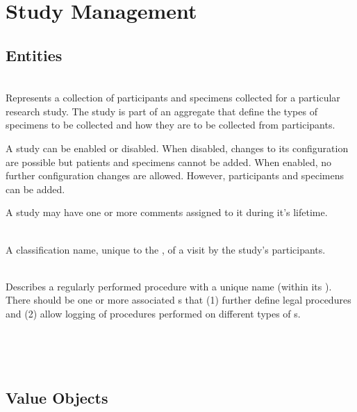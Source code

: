 \chapter{Study Management}

\section{Entities}

\begin{description}[listparindent=\parindent]

  \item[\entitytarget{Study}] \hfill \\ Represents a collection of participants and
    specimens collected for a particular research study. The study is part of
    an aggregate that define the types of specimens to be collected and how
    they are to be collected from participants.

    A study can be enabled or disabled. When disabled, changes to its
    configuration are possible but patients and specimens cannot be added. When
    enabled, no further configuration changes are allowed. However,
    participants and specimens can be added.

    A study may have one or more comments assigned to it during it's lifetime.

  \item[\entitytarget{CollectionEventType}] \hfill \\ A classification name,
    unique to the , of a visit by the study's participants.

  \item[\entitytarget{ProcessingType}] \hfill \\ Describes a regularly
    performed procedure with a unique name (within its
    ). There should be one or more associated
    s that (1) further define legal
    procedures and (2) allow logging of procedures performed on different types
    of s.

  \item[\entitytarget{}] \hfill \\

  \item[\entitytarget{}] \hfill \\


\end{description}

\section{Value Objects}

